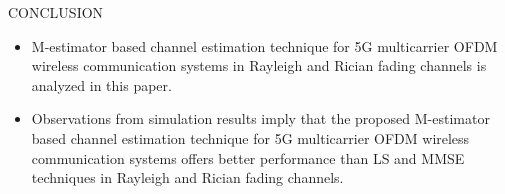 \documentclass{beamer}
\begin{document}
\begin{frame}{CONCLUSION}

\begin{itemize}
    \item M-estimator based channel estimation technique for 5G 
multicarrier OFDM wireless communication systems in 
Rayleigh and Rician fading channels is analyzed in this paper.
    \item Observations from simulation results imply that 
the proposed M-estimator based channel estimation technique 
for 5G multicarrier OFDM wireless communication systems 
offers better performance than LS and MMSE techniques in 
Rayleigh and Rician fading channels. 
\end{itemize}
\end{frame}
\end{document}
